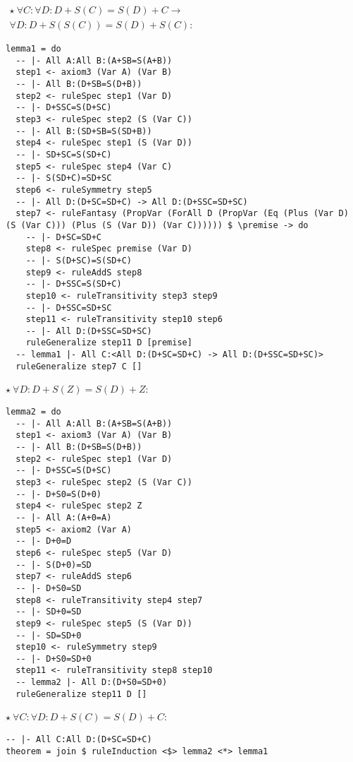 \documentclass{article}
\begin{document}
\begin{minipage}[t]{0.53\textwidth}
$\begin{aligned}
\star \ \forall C: \forall D: D + S(C) = S(D) + C \to \\
\forall D: D + S(S(C)) = S(D) + S(C):
\end{aligned}$

\begin{lstlisting}
lemma1 = do
  -- |- All A:All B:(A+SB=S(A+B))
  step1 <- axiom3 (Var A) (Var B)
  -- |- All B:(D+SB=S(D+B))
  step2 <- ruleSpec step1 (Var D)
  -- |- D+SSC=S(D+SC)
  step3 <- ruleSpec step2 (S (Var C))
  -- |- All B:(SD+SB=S(SD+B))
  step4 <- ruleSpec step1 (S (Var D))
  -- |- SD+SC=S(SD+C)
  step5 <- ruleSpec step4 (Var C)
  -- |- S(SD+C)=SD+SC
  step6 <- ruleSymmetry step5
  -- |- All D:(D+SC=SD+C) -> All D:(D+SSC=SD+SC)
  step7 <- ruleFantasy (PropVar (ForAll D (PropVar (Eq (Plus (Var D) (S (Var C))) (Plus (S (Var D)) (Var C)))))) $ \premise -> do
    -- |- D+SC=SD+C
    step8 <- ruleSpec premise (Var D)
    -- |- S(D+SC)=S(SD+C)
    step9 <- ruleAddS step8
    -- |- D+SSC=S(SD+C)
    step10 <- ruleTransitivity step3 step9
    -- |- D+SSC=SD+SC
    step11 <- ruleTransitivity step10 step6
    -- |- All D:(D+SSC=SD+SC)
    ruleGeneralize step11 D [premise]
  -- lemma1 |- All C:<All D:(D+SC=SD+C) -> All D:(D+SSC=SD+SC)>
  ruleGeneralize step7 C []
\end{lstlisting}
\end{minipage}
\begin{minipage}[t]{0.45\textwidth}
$\star \ \forall D: D + S(Z) = S(D) + Z$:

\begin{lstlisting}
lemma2 = do
  -- |- All A:All B:(A+SB=S(A+B))
  step1 <- axiom3 (Var A) (Var B)
  -- |- All B:(D+SB=S(D+B))
  step2 <- ruleSpec step1 (Var D)
  -- |- D+SSC=S(D+SC)
  step3 <- ruleSpec step2 (S (Var C))
  -- |- D+S0=S(D+0)
  step4 <- ruleSpec step2 Z
  -- |- All A:(A+0=A)
  step5 <- axiom2 (Var A)
  -- |- D+0=D
  step6 <- ruleSpec step5 (Var D)
  -- |- S(D+0)=SD
  step7 <- ruleAddS step6
  -- |- D+S0=SD
  step8 <- ruleTransitivity step4 step7
  -- |- SD+0=SD
  step9 <- ruleSpec step5 (S (Var D))
  -- |- SD=SD+0
  step10 <- ruleSymmetry step9
  -- |- D+S0=SD+0
  step11 <- ruleTransitivity step8 step10
  -- lemma2 |- All D:(D+S0=SD+0)
  ruleGeneralize step11 D []
\end{lstlisting}

$\star \ \forall C: \forall D: D + S(C) = S(D) + C$:

\begin{lstlisting}
-- |- All C:All D:(D+SC=SD+C)
theorem = join $ ruleInduction <$> lemma2 <*> lemma1
\end{lstlisting}
\end{minipage}
\end{document}
